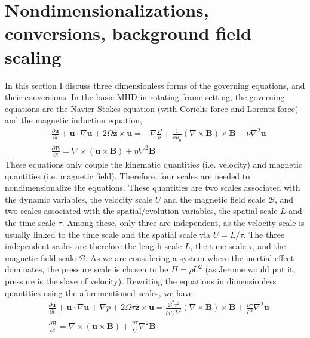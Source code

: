 \section{Nondimensionalizations, conversions, background field scaling}

In this section I discuss three dimensionless forms of the governing equations, and their conversions.
In the basic MHD in rotating frame setting, the governing equations are the Navier Stokes equation (with Coriolis force and Lorentz force) and the magnetic induction equation,
\begin{equation}
\begin{aligned}
    & \frac{\partial \mathbf{u}}{\partial t} + \mathbf{u}\cdot \nabla \mathbf{u} + 2\Omega \hat{\mathbf{z}}\times \mathbf{u} = -\nabla \frac{P}{\rho} + \frac{1}{\rho \mu_0}(\nabla\times\mathbf{B})\times \mathbf{B} + \nu \nabla^2 \mathbf{u} \\ 
    & \frac{\partial \mathbf{B}}{\partial t} = \nabla\times (\mathbf{u}\times \mathbf{B}) + \eta \nabla^2 \mathbf{B}
\end{aligned}
\end{equation}
These equations only couple the kinematic quantities (i.e. velocity) and magnetic quantities (i.e. magnetic field). Therefore, four scales are needed to nondimensionalize the equations. These quantities are two scales associated with the dynamic variables, the velocity scale $U$ and the magnetic field scale $\mathscr{B}$, and two scales associated with the spatial/evolution variables, the spatial scale $L$ and the time scale $\tau$. Among these, only three are independent, as the velocity scale is usually linked to the time scale and the spatial scale via $U = L/\tau$. The three independent scales are therefore the length scale $L$, the time scale $\tau$, and the magnetic field scale $\mathscr{B}$. As we are considering a system where the inertial effect dominates, the pressure scale is chosen to be $\Pi = \rho U^2$ (as Jerome would put it, pressure is the slave of velocity). Rewriting the equations in dimensionless quantities using the aforementioned scales, we have
\[
\begin{aligned}
    & \frac{\partial \mathbf{u}}{\partial t} + \mathbf{u}\cdot \nabla \mathbf{u} + \nabla p + 2\Omega \tau \hat{\mathbf{z}}\times \mathbf{u} = \frac{\mathscr{B}^2 \tau^2}{\rho \mu_0 L^2}(\nabla\times\mathbf{B})\times \mathbf{B} + \frac{\nu \tau}{L^2} \nabla^2 \mathbf{u} \\ 
    & \frac{\partial \mathbf{B}}{\partial t} = \nabla\times (\mathbf{u}\times \mathbf{B}) + \frac{\eta\tau}{L^2} \nabla^2 \mathbf{B}
\end{aligned}
\]

